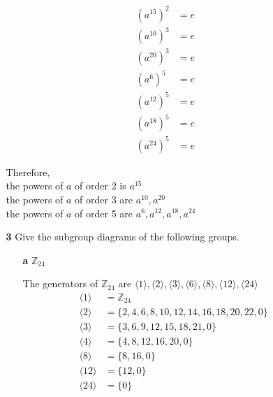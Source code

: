 \documentclass[paper=usletter, fontsize=12pt]{article}
\begin{document}
\begin{itemize}
\begin{itemize}
\begin{cproof}
                \begin{align*}
                    (a^{15})^{2} & = e
                \end{align*}
                \begin{align*}
                    (a^{10})^{3} & = e \\
                    (a^{20})^{3} & = e
                \end{align*}
                \begin{align*}
                    (a^{6})^{5} & = e \\
                    (a^{12})^{5} & = e \\
                    (a^{18})^{5} & = e \\
                    (a^{24})^{5} & = e
                \end{align*}

                Therefore,\\
                the powers of $a$ of order 2 is $a^{15}$\\
                the powers of $a$ of order 3 are $a^{10},a^{20}$\\
                the powers of $a$ of order 5 are $a^{6},a^{12},a^{18},a^{24}$ \qedhere

            \end{cproof}

            \item[\textbf{3}] Give the subgroup diagrams of the following
            groups.
            \begin{enumerate}

                \item[\textbf{a}] $\mathbb{Z}_{24}$
                \begin{cproof}

                    The generators of $\mathbb{Z}_{24}$ are $\langle1\rangle,
                    \langle2\rangle, \langle3\rangle, \langle6\rangle,
                    \langle8\rangle, \langle12\rangle,\langle24\rangle$
                    \begin{align*}
                        \langle1\rangle & = \mathbb{Z}_{24}\\
                        \langle2\rangle & = \{2,4,6,8,10,12,14,16,18,20,22,0\}\\
                        \langle3\rangle & = \{3,6,9,12,15,18,21,0\}\\
                        \langle4\rangle & = \{4,8,12,16,20,0\}\\
                        \langle8\rangle & = \{8,16,0\}\\
                        \langle12\rangle & = \{12,0\}\\
                        \langle24\rangle & = \{0\}
                    \end{align*}


\end{cproof}
\end{enumerate}
\end{itemize}
\end{itemize}
\end{document}
